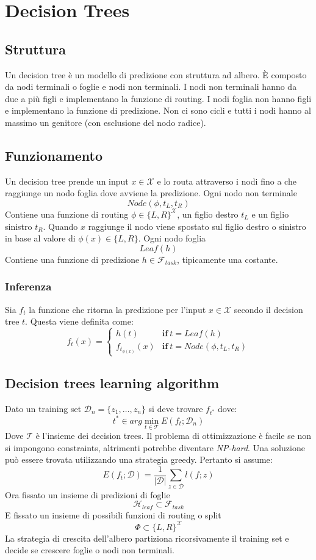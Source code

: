 \chapter{Decision Trees}

\section{Struttura}
Un decision tree \`e un modello di predizione con struttura ad albero.
\`E composto da nodi terminali o foglie e nodi non terminali.
I nodi non terminali hanno da due a pi\`u figli e implementano la funzione di routing.
I nodi foglia non hanno figli e implementano la funzione di predizione.
Non ci sono cicli e tutti i nodi hanno al massimo un genitore (con esclusione del nodo radice).

\section{Funzionamento}
Un decision tree prende un input $x\in\mathcal{X}$ e lo routa attraverso i nodi fino a che raggiunge un nodo foglia dove avviene la predizione.
Ogni nodo non terminale
$$Node(\phi, t_L, t_R)$$
Contiene una funzione di routing $\phi\in\{L, R\}^{\mathcal{X}}$, un figlio destro $t_L$ e un figlio sinistro $t_R$.
Quando $x$ raggiunge il nodo viene spostato sul figlio destro o sinistro in base al valore di $\phi(x)\in\{L,R\}$.
Ogni nodo foglia
$$Leaf(h)$$
Contiene una funzione di predizione $h\in\mathcal{F}_{task}$, tipicamente una costante.

	\subsection{Inferenza}
	Sia $f_t$ la funzione che ritorna la predizione per l'input $x\in\mathcal{X}$ secondo il decision tree $t$.
	Questa viene definita come:
	$$f_t(x)=\begin{cases}h(t)&\mathbf{if}\ t = Leaf(h)\\
										 f_{t_{\phi(x)}}(x)&\mathbf{if}\ t = Node(\phi, t_L, t_R)
				\end{cases}$$

\section{Decision trees learning algorithm}
Dato un training set $\mathcal{D}_n = \{z_1,\dots, z_n\}$ si deve trovare $f_{t^*}$ dove:
$$t^*\in arg\min\limits_{t\in\mathcal{T}} E(f_t;\mathcal{D}_n)$$
Dove $\mathcal{T}$ \`e l'insieme dei decision trees.
Il problema di ottimizzazione \`e facile se non si impongono constraints, altrimenti potrebbe diventare \emph{NP-hard}.
Una soluzione pu\`o essere trovata utilizzando una strategia greedy.
Pertanto si assume:
$$E(f_t;\mathcal{D}) = \dfrac{1}{|\mathcal{D}|}\sum\limits_{z\in\mathcal{D}}l(f;z)$$
Ora fissato un insieme di predizioni di foglie
$$\mathcal{H}_{leaf}\subset\mathcal{F}_{task}$$
E fissato un insieme di possibili funzioni di routing o split
$$\Phi\subset\{L,R\}^\mathcal{X}$$
La strategia di crescita dell'albero partiziona ricorsivamente il training set e decide se crescere foglie o nodi non terminali.

